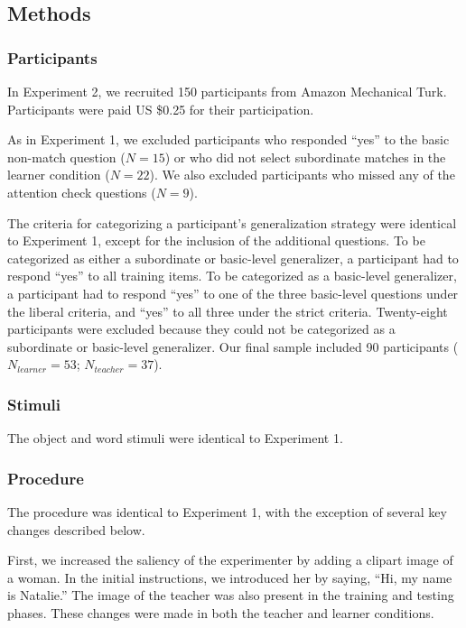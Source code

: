 \documentclass[man]{apa2}
\begin{document}
\subsection{Methods}

\subsubsection{Participants} In Experiment 2, we recruited 150 participants from Amazon Mechanical Turk. Participants were paid US \$0.25 for their participation.

As in Experiment 1, we excluded participants who responded ``yes'' to the basic non-match question ($N=15$) or who did not select subordinate matches in the learner condition ($N = 22$). We also excluded participants who missed any of the attention check questions ($N = 9$).

The criteria for categorizing a participant's generalization strategy were identical to Experiment 1, except for the inclusion of the additional questions. To be categorized as either a subordinate or basic-level generalizer, a participant had to respond ``yes'' to all training items. To be categorized as a basic-level generalizer, a participant had to respond ``yes'' to one of the three basic-level questions under the liberal criteria, and ``yes'' to all three under the strict criteria. Twenty-eight participants were excluded because they could not be categorized as a subordinate or basic-level generalizer.  Our final sample included 90 participants ($N_{learner} = 53$; $N_{teacher} = 37$).


\subsubsection{Stimuli}
The object and word stimuli were identical to Experiment 1.

\subsubsection{Procedure}
The procedure was identical to Experiment 1, with the exception of several key changes described below.

First, we increased the saliency of the experimenter by adding a clipart image of a woman. In the initial instructions, we introduced her by saying, ``Hi, my name is Natalie.'' The image of the teacher was also present in the training and testing phases. These changes were made in both the teacher and learner conditions.
\end{document}
